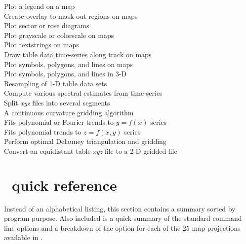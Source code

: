 \begin{tabbing}
	\>	Plot a legend on a map \\ 
	\>	Create overlay to mask out regions on maps \\ 
	\>	Plot sector or rose diagrams \\ 
	\>	Plot grayscale or colorscale on maps \\ 
	\>	Plot textstrings on maps \\ 
	\>	Draw table data time-series along track on maps \\ 
		\>	Plot symbols, polygons, and lines on maps \\ 
		\>	Plot symbols, polygons, and lines in 3-D \\ 
	\>	Resampling of 1-D table data sets \\ 
	\>	Compute various spectral estimates from time-series \\ 
	\>	Split {\it xyz} files into several segments \\ 
	\>	A continuous curvature gridding algorithm \\ 
	\>	Fits polynomial or Fourier trends to $y = f(x)$ series \\ 
	\>	Fits polynomial trends to $z = f(x,y)$ series \\ 
	\>	Perform optimal Delauney triangulation and gridding \\ 
	\>	Convert an equidistant table {\it xyz} file to a 2-D gridded file
\end{tabbing}

\section{\gmt\ quick reference}
\label{sec:purpose}
Instead of an alphabetical listing, this section contains a summary
sorted by program purpose.  Also included is a quick summary of the
standard command line options and a breakdown of the  option
for each of the 25 map projections available in \GMT. \\

